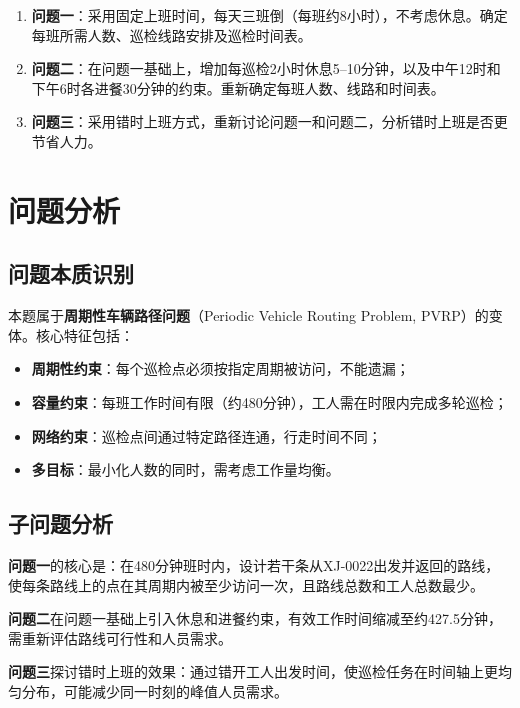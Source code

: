 \documentclass[12pt,a4paper]{article}
\begin{document}
\begin{enumerate}[label=(\arabic*)]
    \item \textbf{问题一}：采用固定上班时间，每天三班倒（每班约8小时），不考虑休息。确定每班所需人数、巡检线路安排及巡检时间表。
    \item \textbf{问题二}：在问题一基础上，增加每巡检2小时休息5--10分钟，以及中午12时和下午6时各进餐30分钟的约束。重新确定每班人数、线路和时间表。
    \item \textbf{问题三}：采用错时上班方式，重新讨论问题一和问题二，分析错时上班是否更节省人力。
\end{enumerate}

\section{问题分析}

\subsection{问题本质识别}

本题属于\textbf{周期性车辆路径问题}（Periodic Vehicle Routing Problem, PVRP）的变体。核心特征包括：
\begin{itemize}
    \item \textbf{周期性约束}：每个巡检点必须按指定周期被访问，不能遗漏；
    \item \textbf{容量约束}：每班工作时间有限（约480分钟），工人需在时限内完成多轮巡检；
    \item \textbf{网络约束}：巡检点间通过特定路径连通，行走时间不同；
    \item \textbf{多目标}：最小化人数的同时，需考虑工作量均衡。
\end{itemize}

\subsection{子问题分析}

\textbf{问题一}的核心是：在480分钟班时内，设计若干条从XJ-0022出发并返回的路线，使每条路线上的点在其周期内被至少访问一次，且路线总数和工人总数最少。

\textbf{问题二}在问题一基础上引入休息和进餐约束，有效工作时间缩减至约427.5分钟，需重新评估路线可行性和人员需求。

\textbf{问题三}探讨错时上班的效果：通过错开工人出发时间，使巡检任务在时间轴上更均匀分布，可能减少同一时刻的峰值人员需求。
\end{document}
